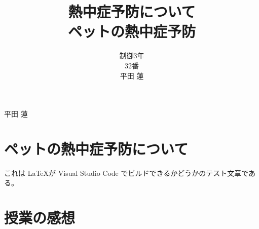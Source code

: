 \documentclass[titlepage]{jsarticle}
\title{
  熱中症予防について \\
  \large ペットの熱中症予防
}
\date{}
\author{
  制御3年 \\
  32番 \\
  平田 蓮
}
\begin{document}
  \maketitle
  \begin{flushright}
    平田 蓮
  \end{flushright}
  \section{ペットの熱中症予防について}
      これは \LaTeX が Visual Studio Code でビルドできるかどうかのテスト文章である。
  \section{授業の感想}
\end{document}
